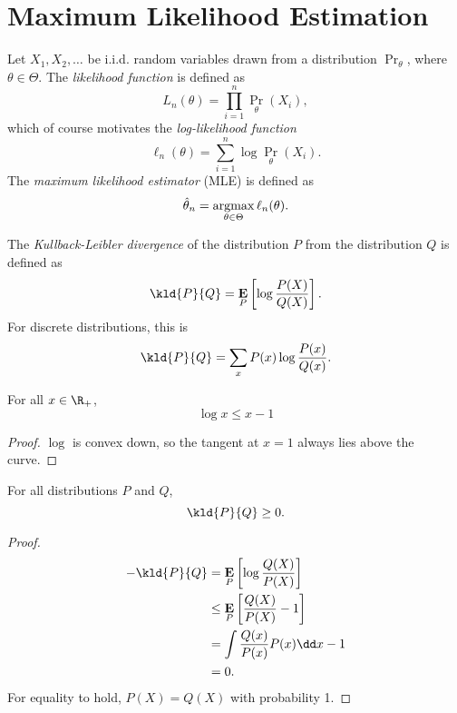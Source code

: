 \chapter{Maximum Likelihood Estimation} \label{chp:mle}

\begin{definition} \label{def:mle}
    Let $X_1, X_2, \dots$ be i.i.d. random variables drawn from a
    distribution $\Pr_{\theta}$, where $\theta \in \Theta$.
    The \emph{likelihood function} is defined as \[
        L_n(\theta) = \prod_{i=1}^{n} \Pr_{\theta}(X_i),
    \]
    which of course motivates the
    \emph{log-likelihood function} \[
        \ell_n(\theta) = \sum_{i=1}^{n} \log \Pr_{\theta}(X_i).
    \] The \emph{maximum likelihood estimator} (MLE) is defined as \[
        \hat{\theta}_n = \operatorname*{argmax}_{\theta \in \Theta} \ell_n(\theta).
    \]
\end{definition}

\begin{definition*}[KL divergence] \label{def:kl_div}
    The \emph{Kullback-Leibler divergence} of the distribution $P$ from the
    distribution $Q$ is defined as \[
        \kld{P}{Q} = \E_P \left[\log \frac{P(X)}{Q(X)} \right].
    \]
    For discrete distributions, this is \[
        \kld{P}{Q} = \sum_{x} P(x) \log \frac{P(x)}{Q(x)}.
    \]
\end{definition*}

\begin{lemma}
    For all $x \in \R_+$, \[
        \log x \le x - 1
    \]
\end{lemma}
\begin{proof}
    $\log$ is convex down, so the tangent at $x = 1$ always lies above the
    curve.
\end{proof}
\begin{proposition}
    For all distributions $P$ and $Q$, \[
        \kld{P}{Q} \ge 0.
    \]
\end{proposition}
\begin{proof}
    \begin{align*}
        -\kld{P}{Q} &= \E_P \left[\log \frac{Q(X)}{P(X)} \right] \\
        &\le \E_P \left[\frac{Q(X)}{P(X)} - 1 \right] \\
        &= \int \frac{Q(x)}{P(x)} P(x) \dd x - 1 \\
        &= 0.
    \end{align*}
    For equality to hold, $P(X) = Q(X)$ with probability 1.
\end{proof}


